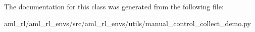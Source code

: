 The documentation for this class was generated from the following file\-:\begin{DoxyCompactItemize}
\item 
aml\-\_\-rl/aml\-\_\-rl\-\_\-envs/src/aml\-\_\-rl\-\_\-envs/utils/manual\-\_\-control\-\_\-collect\-\_\-demo.\-py\end{DoxyCompactItemize}

